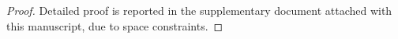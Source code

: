 \documentclass[lettersize,journal]{IEEEtran}
\newtheorem{proof}{Proof}
\begin{document}
\begin{proof}
Detailed proof is reported in the supplementary document attached with this manuscript, due to space constraints.










\end{proof}
\end{document}

